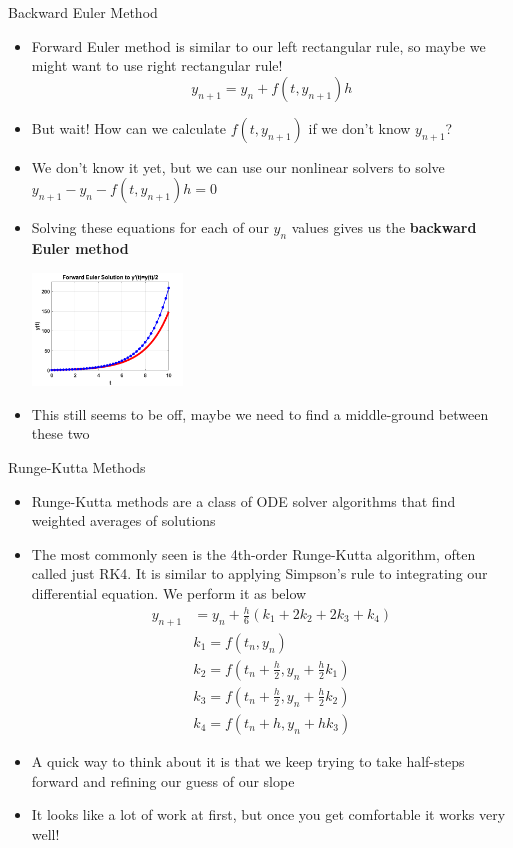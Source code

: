 {}\documentclass[letterpaper,
compress,
xcolor=x11names,
]{beamer}
\begin{document}

\begin{frame}{Backward Euler Method}
	\footnotesize
	\begin{itemize}
		\item Forward Euler method is similar to our left rectangular rule, so maybe we might want to use right rectangular rule!
		\begin{equation*}
			y_{n+1} = y_n + f(t,y_{n+1})h
		\end{equation*}
		\item But wait! How can we calculate $f(t,y_{n+1})$ if we don't know $y_{n+1}$?
		\item We don't know it yet, but we can use our nonlinear solvers to solve $y_{n+1} - y_n - f(t,y_{n+1})h = 0$
		\item Solving these equations for each of our $y_n$ values gives us the \textbf{backward Euler method}
		\begin{center}
			\includegraphics[height = 3cm]{Imp_Euler_w_Sln.png}
		\end{center}
		\item This still seems to be off, maybe we need to find a middle-ground between these two
	\end{itemize}
\end{frame}


\begin{frame}{Runge-Kutta Methods}
	\footnotesize
	\begin{itemize}
		\item Runge-Kutta methods are a class of ODE solver algorithms that find weighted averages of solutions
		\item The most commonly seen is the 4th-order Runge-Kutta algorithm, often called just RK4. It is similar to applying Simpson's rule to integrating our differential equation. We perform it as below
		\begin{align*}
			y_{n+1} &= y_n + \frac{h}{6}(k_1 + 2k_2 + 2k_3 + k_4) \\
			&k_1 = f(t_n, y_n) \\
			&k_2 = f(t_n + \frac{h}{2}, y_n + \frac{h}{2}k_1) \\
			&k_3 = f(t_n + \frac{h}{2}, y_n + \frac{h}{2}k_2) \\
			&k_4 = f(t_n + h, y_n + hk_3) 
		\end{align*}
		\item A quick way to think about it is that we keep trying to take half-steps forward and refining our guess of our slope
		\item It looks like a lot of work at first, but once you get comfortable it works very well!
	\end{itemize}
\end{frame}
\end{document}
